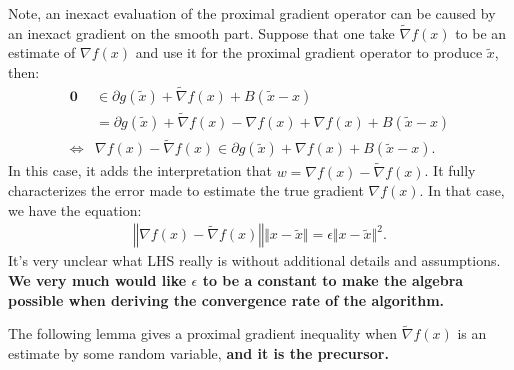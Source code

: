 \documentclass[12pt]{article}
\begin{document}
        Note, an inexact evaluation of the proximal gradient operator can be caused by an inexact gradient on the smooth part. 
        Suppose that one take $\tilde \nabla f(x)$ to be an estimate of $\nabla f(x)$ and use it for the proximal gradient operator to produce $\tilde x$, then: 
        \begin{align*}
            \mathbf 0 
            &\in \partial g(\tilde x) + \tilde \nabla f(x) + B(\tilde x - x)
            \\
            &= 
            \partial g(\tilde x) + \tilde\nabla f(x) - \nabla f(x) 
            + \nabla f(x) + B(\tilde x - x)
            \\
            \iff &
            \nabla f(x) - \tilde \nabla f(x) \in 
            \partial g(\tilde x) 
            + \nabla f(x) + B(\tilde x - x).
        \end{align*}
        In this case, it adds the interpretation that $w = \nabla f(x) - \tilde \nabla f(x)$. 
        It fully characterizes the error made to estimate the true gradient $\nabla f(x)$. 
        In that case, we have the equation: 
        \begin{align*}
            \left\Vert \nabla f(x) - \tilde \nabla f(x) \right\Vert \Vert x - \tilde x\Vert
            = \epsilon \Vert x - \tilde x\Vert^2. 
        \end{align*}
        It's very unclear what LHS really is without additional details and assumptions. 
        \textbf{We very much would like $\epsilon$ to be a constant to make the algebra possible when deriving the convergence rate of the algorithm. }
        \par
        The following lemma gives a proximal gradient inequality when $\tilde \nabla f(x)$ is an estimate by some random variable, \textbf{and it is the precursor.} 
\end{document}
